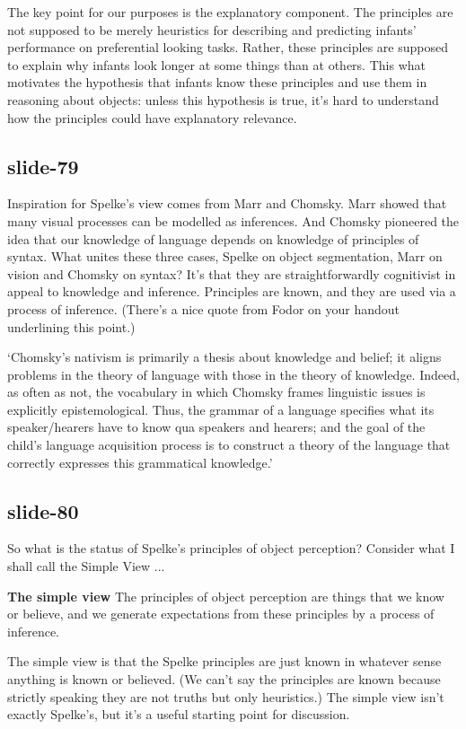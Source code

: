 \documentclass[12pt,\papersize]{extarticle}
\begin{document}
The key point for our purposes is the explanatory component.
The principles are not supposed to be merely heuristics for describing and predicting infants’ 
performance on preferential looking tasks.
Rather, these principles are supposed to explain why infants look longer at some things than at 
others.
This what motivates the hypothesis that infants know these principles and use them in 
reasoning about objects: unless this hypothesis is true, it’s hard to understand how the 
principles could have explanatory relevance.
 
\subsection{slide-79}
Inspiration for Spelke’s view comes from Marr and Chomsky.
Marr showed that many visual processes can be modelled as inferences.
And Chomsky pioneered the idea that our knowledge of language depends on knowledge of 
principles of syntax.
What unites these three cases, Spelke on object segmentation, Marr on vision and Chomsky on 
syntax?
It’s that they are straightforwardly cognitivist in appeal to knowledge and inference.
Principles are known, and they are used via a process of inference.
(There’s a nice quote from Fodor on your handout underlining this point.)
 
‘Chomsky’s nativism is primarily a thesis about knowledge and belief; it aligns problems 
in the theory of language with those in the theory of knowledge.  Indeed, as often as not, 
the vocabulary in which Chomsky frames linguistic issues is explicitly epistemological.  
Thus, the grammar of a language specifies what its speaker/hearers have to know qua speakers 
and hearers; and the goal of the child’s language acquisition process is to construct a 
theory of the language that correctly expresses this grammatical knowledge.’
\citep[p.\ 11]{Fodor:2000cj}
 
\subsection{slide-80}
So what is the status of Spelke’s principles of object perception?
Consider what I shall call the Simple View ...
 
\textbf{The simple view}
The principles of object perception are things that we know or believe, 
and we generate expectations from these principles by a process of inference.
 
The simple view is that the Spelke principles are just known in whatever sense anything is 
known or believed.
(We can't say the principles are known because strictly speaking they are not truths but only
heuristics.)
The simple view isn’t exactly Spelke’s, but it’s a useful starting point for discussion.
 
\end{document}
